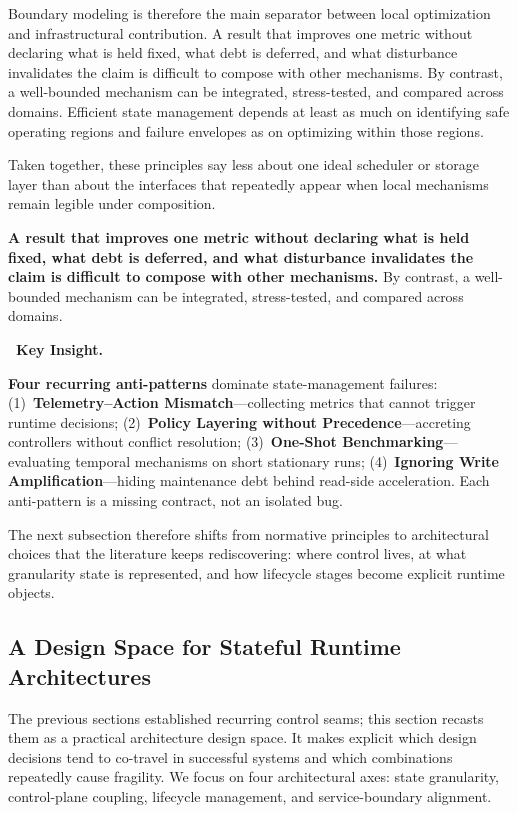 \documentclass[acmsmall,screen,review]{acmart}
\newenvironment{keybox}{%
  \vspace{6pt}\noindent
  \begin{lrbox}{\keyboxcontent}
  \begin{minipage}{\dimexpr\linewidth-2\fboxsep-2\fboxrule\relax}
  \raggedright
  \textbf{\faLightbulbO\ \textcolor{keyborder}{Key Insight.}}\par\smallskip
}{%
  \end{minipage}
  \end{lrbox}
  \fcolorbox{keyborder}{keybg}{\usebox{\keyboxcontent}}%
  \vspace{6pt}%
}
\newenvironment{quotebox}{%
  \vspace{4pt}\noindent
  \begin{lrbox}{\quoteboxcontent}
  \begin{minipage}{\dimexpr\linewidth-2\fboxsep-2\fboxrule-14pt\relax}
  \raggedright\small\itshape
  \hspace{6pt}%
}{%
  \end{minipage}
  \end{lrbox}
  \setlength{\fboxrule}{0.8pt}%
  \fcolorbox{quoteborder}{white}{\usebox{\quoteboxcontent}}%
  \vspace{4pt}%
}
\begin{document}
Boundary modeling is therefore the main separator between local optimization and infrastructural contribution. A result that improves one metric without declaring what is held fixed, what debt is deferred, and what disturbance invalidates the claim is difficult to compose with other mechanisms. By contrast, a well-bounded mechanism can be integrated, stress-tested, and compared across domains. Efficient state management depends at least as much on identifying safe operating regions and failure envelopes as on optimizing within those regions.

Taken together, these principles say less about one ideal scheduler or storage layer than about the interfaces that repeatedly appear when local mechanisms remain legible under composition.

\begin{quotebox}
\textbf{A result that improves one metric without declaring what is held fixed, what debt is deferred, and what disturbance invalidates the claim is difficult to compose with other mechanisms.} By contrast, a well-bounded mechanism can be integrated, stress-tested, and compared across domains.
\end{quotebox}
\begin{keybox}
\textbf{Four recurring anti-patterns} dominate state-management failures: (1)~\textbf{Telemetry--Action Mismatch}---collecting metrics that cannot trigger runtime decisions; (2)~\textbf{Policy Layering without Precedence}---accreting controllers without conflict resolution; (3)~\textbf{One-Shot Benchmarking}---evaluating temporal mechanisms on short stationary runs; (4)~\textbf{Ignoring Write Amplification}---hiding maintenance debt behind read-side acceleration. Each anti-pattern is a missing contract, not an isolated bug.
\end{keybox} The next subsection therefore shifts from normative principles to architectural choices that the literature keeps rediscovering: where control lives, at what granularity state is represented, and how lifecycle stages become explicit runtime objects.

\subsection{A Design Space for Stateful Runtime Architectures}

The previous sections established recurring control seams; this section recasts them as a practical architecture design space. It makes explicit which design decisions tend to co-travel in successful systems and which combinations repeatedly cause fragility. We focus on four architectural axes: state granularity, control-plane coupling, lifecycle management, and service-boundary alignment.
\end{document}
